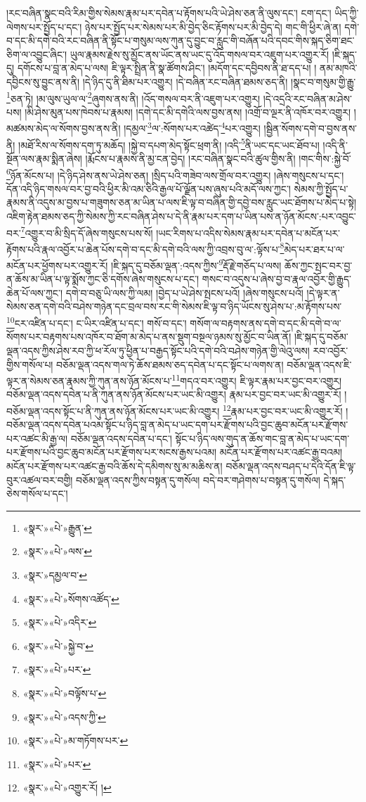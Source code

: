 །རང་བཞིན་སྣང་བའི་རིམ་གྱིས་སེམས་རྣམ་པར་དབེན་པ་རྟོགས་པའི་ཡེ་ཤེས་ཅན་ནི་ལུས་དང་། ངག་དང་། ཡིད་ཀྱི་ལེགས་པར་སྤྱོད་པ་དང་། ཉེས་པར་སྤྱོད་པར་སེམས་པར་མི་བྱེད་ཅིང་རྟོགས་པར་མི་བྱེད་དེ། གང་གི་ཕྱིར་ཞེ་ན། དགེ་བ་དང་མི་དགེ་བའི་རང་བཞིན་ནི་སྟོང་པ་གསུམ་ལས་ཀུན་དུ་བྱུང་བ་རླུང་གི་བཞོན་པའི་དབང་གིས་སྐད་ཅིག་ཐང་ཅིག་ལ་འབྱུང་ཞིང་། ཡུལ་རྣམས་རྗེས་སུ་མྱོང་ནས་ཡོང་ནས་ཡང་དུ་འོད་གསལ་བར་འཇུག་པར་འགྱུར་རོ། །ཇི་སྐད་དུ། དགོངས་པ་བླ་ན་མེད་པ་ལས། ཇི་ལྟར་སྤྲིན་ནི་སྣ་ཚོགས་ཤིང་། །མདོག་དང་དབྱིབས་ནི་ཐ་དད་པ། །
ནམ་མཁའི་དབྱིངས་སུ་བྱུང་ནས་ནི། །དེ་ཉིད་དུ་ནི་ཐིམ་པར་འགྱུར། །དེ་བཞིན་རང་བཞིན་ཐམས་ཅད་ནི། །སྣང་བ་གསུམ་གྱི་རྒྱུ་\footnote{«སྣར་»«པེ་»རྒྱུན་}ཅན་ཏེ། །མ་ལུས་ཡུལ་ལ་\footnote{«སྣར་»«པེ་»ལས་}ཞུགས་ནས་ནི། །འོད་གསལ་བར་ནི་འཇུག་པར་འགྱུར། །དེ་འདྲའི་རང་བཞིན་མ་ཤེས་པས། །མི་ཤེས་མུན་པས་ཁེབས་པ་རྣམས། །དགེ་དང་མི་དགེའི་ལས་བྱས་ནས། །འགྲོ་བ་ལྔར་ནི་འཁོར་བར་འགྱུར། །མཚམས་མེད་ལ་སོགས་བྱས་ནས་ནི། །དམྱལ་\footnote{«སྣར་»དམྱལ་བ་}ལ་:སོགས་པར་འཚེད་\footnote{«སྣར་»«པེ་»སོགས་འཚོད་}པར་འགྱུར། །སྦྱིན་སོགས་དགེ་བ་བྱས་ནས་ནི། །མཐོ་རིས་ལ་སོགས་དག་ཏུ་མཆོད། །སྐྱེ་བ་དཔག་མེད་སྟོང་ཕྲག་ནི། །འདི་\footnote{«སྣར་»«པེ་»འདིར་}ནི་ཡང་དང་ཡང་ཐོབ་པ། །འདི་ནི་སྔོན་ལས་རྣམ་སྨིན་ཞེས། །རྨོངས་པ་རྣམས་ནི་མྱ་ངན་བྱེད། །རང་བཞིན་སྣང་བའི་ཚུལ་གྱིས་ནི། །གང་གིས་:སྐྱེ་བོ་\footnote{«སྣར་»«པེ་»སྐྱེ་བ་}ཉོན་མོངས་པ། །དེ་ཉིད་ཤེས་ནས་ཡེ་ཤེས་ཅན། །སྲིད་པའི་གཟེབ་ལས་གྲོལ་བར་འགྱུར། །ཞེས་གསུངས་པ་དང་། དོན་འདི་ཉིད་གསལ་བར་བྱ་བའི་ཕྱིར་མི་འམ་ཅིའི་རྒྱལ་པོ་ལྗོན་པས་ཞུས་པའི་མདོ་ལས་ཀྱང་། སེམས་ཀྱི་སྤྱོད་པ་རྣམས་ནི་འདུས་མ་བྱས་པ་གཟུགས་ཅན་མ་ཡིན་པ་ལས་ཇི་ལྟ་བ་བཞིན་གྱི་དབྱེ་བས་རླུང་ཡང་ཐོགས་པ་མེད་པ་སྟེ། འཇིག་རྟེན་ཐམས་ཅད་ཀྱི་སེམས་ཀྱི་རང་བཞིན་ཤེས་པ་དེ་ནི་རྣམ་པར་དག་པ་ཡིན་པས་ན་ཉོན་མོངས་:པར་འབྱུང་བར་\footnote{«སྣར་»«པེ་»པར་}འགྱུར་བ་མི་སྲིད་དོ་ཞེས་གསུངས་པས་སོ། །ཡང་རིགས་པ་འདིས་སེམས་རྣམ་པར་དབེན་པ་མངོན་པར་རྟོགས་པའི་རྣལ་འབྱོར་པ་ཆེན་པོས་དགེ་བ་དང་མི་དགེ་བའི་ལས་ཀྱི་འབྲས་བུ་ལ་:ལྟོས་པ་\footnote{«སྣར་»«པེ་»བལྟོས་པ་}མེད་པར་ཐར་པ་ལ་མངོན་པར་ཕྱོགས་པར་འགྱུར་རོ། །ཇི་སྐད་དུ་བཅོམ་ལྡན་:འདས་ཀྱིས་\footnote{«སྣར་»«པེ་»འདས་ཀྱི་}རྡོ་རྗེ་གཅོད་པ་ལས། ཆོས་ཀྱང་སྤང་བར་བྱ་ན་ཆོས་མ་ཡིན་པ་ལྟ་སྨོས་ཀྱང་ཅི་དགོས་ཞེས་གསུངས་པ་དང་། གསང་བ་འདུས་པ་ཞེས་བྱ་བ་རྣལ་འབྱོར་གྱི་རྒྱུད་ཆེན་པོ་ལས་ཀྱང་། དགེ་བ་བཅུ་ཡི་ལས་ཀྱི་ལམ། །བྱེད་པ་ཡེ་ཤེས་སྤངས་པའོ། །ཞེས་གསུངས་པའོ། །དེ་ལྟར་ན་སེམས་ཅན་དགེ་བའི་བཤེས་གཉེན་དང་བྲལ་བས་རང་གི་སེམས་ཇི་ལྟ་བ་ཉིད་ཡོངས་སུ་ཤེས་པ་:མ་རྟོགས་པས་\footnote{«སྣར་»«པེ་»མ་གཏོགས་པར་}ངར་འཛིན་པ་དང་། ང་ཡིར་འཛིན་པ་དང་། གསོ་བ་དང་། གསོག་ལ་བརྟགས་ནས་དགེ་བ་དང་མི་དགེ་བ་ལ་སོགས་པར་བརྟགས་པས་འཁོར་བ་ཐོག་མ་མེད་པ་ནས་སྡུག་བསྔལ་ཉམས་སུ་མྱོང་བ་ཡིན་ནོ། །ཇི་སྐད་དུ་བཅོམ་ལྡན་འདས་ཀྱིས་ཤེས་རབ་ཀྱི་ཕ་རོལ་ཏུ་ཕྱིན་པ་བརྒྱད་སྟོང་པའི་དགེ་བའི་བཤེས་གཉེན་གྱི་ལེའུ་ལས། རབ་འབྱོར་གྱིས་གསོལ་པ། བཅོམ་ལྡན་འདས་གལ་ཏེ་ཆོས་ཐམས་ཅད་དབེན་པ་དང་སྟོང་པ་ལགས་ན། བཅོམ་ལྡན་འདས་ཇི་ལྟར་ན་སེམས་ཅན་རྣམས་ཀྱི་ཀུན་ནས་ཉོན་མོངས་པ་\footnote{«སྣར་»«པེ་»པར་}གདའ་བར་འགྱུར། ཇི་ལྟར་རྣམ་པར་བྱང་བར་འགྱུར། བཅོམ་ལྡན་འདས་དབེན་པ་ནི་ཀུན་ནས་ཉོན་མོངས་པར་ཡང་མི་འགྱུར། རྣམ་པར་བྱང་བར་ཡང་མི་འགྱུར་རོ། །བཅོམ་ལྡན་འདས་སྟོང་པ་ནི་ཀུན་ནས་ཉོན་མོངས་པར་ཡང་མི་འགྱུར། \footnote{«སྣར་»«པེ་»འགྱུར་རོ། ། }རྣམ་པར་བྱང་བར་ཡང་མི་འགྱུར་རོ། །བཅོམ་ལྡན་འདས་དབེན་པའམ་སྟོང་པ་ཉིད་བླ་ན་མེད་པ་ཡང་དག་པར་རྫོགས་པའི་བྱང་ཆུབ་མངོན་པར་རྫོགས་པར་འཚང་མི་རྒྱ་ལ། བཅོམ་ལྡན་འདས་དབེན་པ་དང་། སྟོང་པ་ཉིད་ལས་གུད་ན་ཆོས་གང་བླ་ན་མེད་པ་ཡང་དག་པར་རྫོགས་པའི་བྱང་ཆུབ་མངོན་པར་རྫོགས་པར་སངས་རྒྱས་པའམ། མངོན་པར་རྫོགས་པར་འཚང་རྒྱ་བའམ། མངོན་པར་རྫོགས་པར་འཚང་རྒྱ་བའི་ཆོས་དེ་དམིགས་སུ་མ་མཆིས་ན། བཅོམ་ལྡན་འདས་བཤད་པ་དེའི་དོན་ཇི་ལྟ་བུར་འཚལ་བར་བགྱི། བཅོམ་ལྡན་འདས་ཀྱིས་བསྟན་དུ་གསོལ། བདེ་བར་གཤེགས་པ་བསྟན་དུ་གསོལ། དེ་སྐད་ཅེས་གསོལ་པ་དང་། 